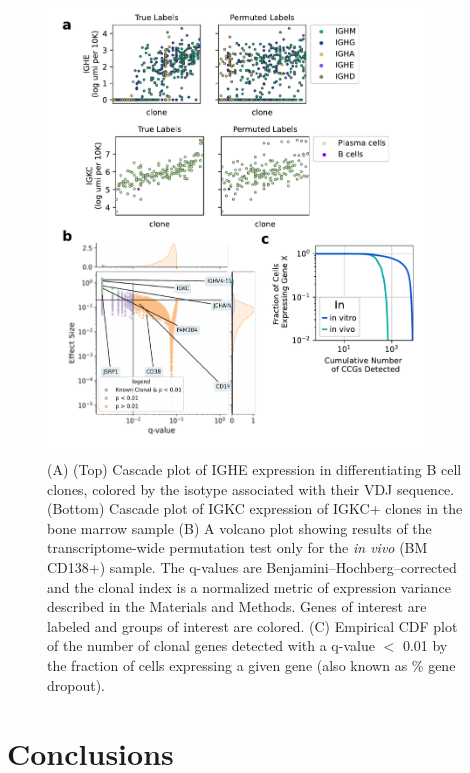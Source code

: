 \begin{figure}[hbt!]
\centering
\includegraphics[width=10cm, keepaspectratio]{figs/InVitro/figS4_bcd_small.pdf}
\caption[Analysis of persistent \textit{in vivo} transcriptional programs.]{(A) (Top) Cascade plot of IGHE expression in differentiating B cell clones, colored by the isotype associated with their VDJ sequence. (Bottom) Cascade plot of IGKC expression of IGKC+ clones in the bone marrow sample (B) A volcano plot showing results of the transcriptome-wide permutation test only for the \textit{in vivo} (BM CD138+) sample. The q-values are Benjamini–Hochberg–corrected and the clonal index is a normalized metric of expression variance described in the Materials and Methods. Genes of interest are labeled and groups of interest are colored. (C) Empirical CDF plot of the number of clonal genes detected with a q-value $<$ 0.01 by the fraction of cells expressing a given gene (also known as \% gene dropout).}
\label{fig:paper2_fig_s4}
\end{figure}

\section{Conclusions}

